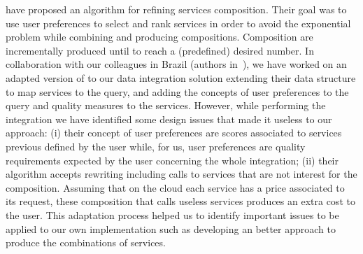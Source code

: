 \documentclass[11pt,a4paper,oneside]{report}
\begin{document}
\cite{ba2014} have proposed an algorithm for refining services composition. Their goal was to use user preferences to select and rank services in order to avoid the exponential problem while combining and producing compositions. Composition are incrementally produced until to reach a (predefined) desired number. In collaboration with our colleagues in Brazil (authors in~\cite{ba2014}), we have worked on an adapted version of \cite{ba2014} to our data integration solution extending their data structure to map services to the query, and adding the concepts of user preferences to the query and quality measures to the services. However, while performing the integration we have identified some design issues that made it useless to our approach: (i) their concept of user preferences are scores associated to services previous defined by the user while, for us, user preferences are quality requirements expected by the user concerning the whole integration; (ii) their algorithm accepts rewriting including calls to services that are not interest for the composition. Assuming that on the cloud each service has a price associated to its request, these composition that calls useless services produces an extra cost to the user. This adaptation process helped us to identify important issues to be applied to our own implementation such as developing an better approach to produce the combinations of services.


\end{document}
